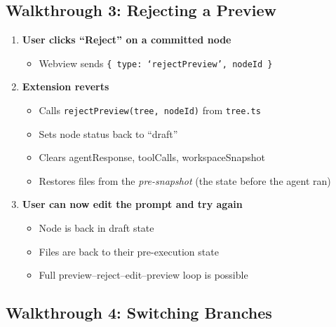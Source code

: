 \documentclass[12pt, a4paper]{article}
\begin{document}
\subsection{Walkthrough 3: Rejecting a Preview}

\begin{enumerate}[label=\textbf{Step \arabic*:}, leftmargin=3cm]
    \item \textbf{User clicks ``Reject'' on a committed node}
    \begin{itemize}
        \item Webview sends \texttt{\{ type: `rejectPreview', nodeId \}}
    \end{itemize}

    \item \textbf{Extension reverts}
    \begin{itemize}
        \item Calls \texttt{rejectPreview(tree, nodeId)} from \texttt{tree.ts}
        \item Sets node status back to ``draft''
        \item Clears agentResponse, toolCalls, workspaceSnapshot
        \item Restores files from the \textit{pre-snapshot} (the state before the agent ran)
    \end{itemize}

    \item \textbf{User can now edit the prompt and try again}
    \begin{itemize}
        \item Node is back in draft state
        \item Files are back to their pre-execution state
        \item Full preview--reject--edit--preview loop is possible
    \end{itemize}
\end{enumerate}

\subsection{Walkthrough 4: Switching Branches}
\end{document}
